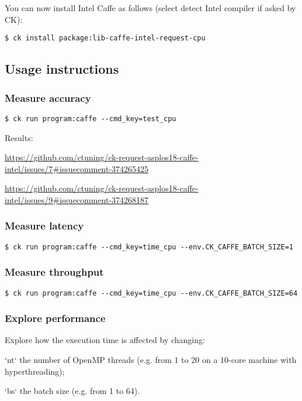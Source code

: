 \documentclass[sigplan]{acmart}
\newenvironment{packed_itemize}{
\begin{itemize}
  \setlength{\itemsep}{1pt}
  \setlength{\parskip}{0pt}
  \setlength{\parsep}{0pt}
}{\end{itemize}}
\begin{document}
You can now install Intel Caffe as follows (select detect Intel compiler if asked by CK):
\begin{verbatim}
$ ck install package:lib-caffe-intel-request-cpu
\end{verbatim}

\subsection{Usage instructions}

\subsubsection{Measure accuracy}
\begin{verbatim}
$ ck run program:caffe --cmd_key=test_cpu
\end{verbatim}

Results:
\begin{packed_itemize}
 \item \url{https://github.com/ctuning/ck-request-asplos18-caffe-intel/issues/7#issuecomment-374265425}
 \item \url{https://github.com/ctuning/ck-request-asplos18-caffe-intel/issues/9#issuecomment-374268187}
\end{packed_itemize}

\subsubsection{Measure latency}
\begin{verbatim}
$ ck run program:caffe --cmd_key=time_cpu --env.CK_CAFFE_BATCH_SIZE=1
\end{verbatim}

\subsubsection{Measure throughput}
\begin{verbatim}
$ ck run program:caffe --cmd_key=time_cpu --env.CK_CAFFE_BATCH_SIZE=64
\end{verbatim}

\subsubsection{Explore performance}

Explore how the execution time is affected by changing:
\begin{packed_itemize}
 \item [`nt`] the number of OpenMP threads (e.g. from 1 to 20 on a 10-core machine with hyperthreading);
 \item [`bs`] the batch size (e.g. from 1 to 64).
\end{packed_itemize}
\end{document}
